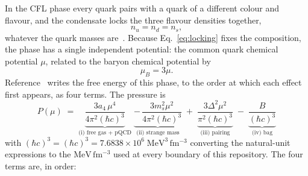 \documentclass[aps,prc,onecolumn,superscriptaddress,nofootinbib,10pt]{revtex4-2}
\newcommand{\muB}{\mu_B}
\newcommand{\hc}{(\hbar c)^3}
\newcommand{\ms}{m_s}
\begin{document}
In the CFL phase every quark pairs with a quark of a different colour and
flavour, and the condensate locks the three flavour densities together,
%
\begin{equation}
n_u = n_d = n_s ,
\label{eq:locking}
\end{equation}
%
whatever the quark masses are~\cite{AlfordRajagopalWilczek1999}. Because
Eq.~\eqref{eq:locking} fixes the composition, the phase has a single
independent potential: the common quark chemical potential $\mu$, related to
the baryon chemical potential by
%
\begin{equation}
\muB = 3\mu .
\label{eq:muB}
\end{equation}
%
Reference~\cite{AlfordBrabyParisReddy2005} writes the free energy of this
phase, to the order at which each effect first appears, as four terms. The
pressure is
%
\begin{equation}
\boxed{\;
P(\mu) \;=\; \underbrace{\frac{3 a_4\, \mu^4}{4\pi^2 \hc}}_{\text{(i) free gas
              + pQCD}}
        \;\underbrace{-\, \frac{3 \ms^2 \mu^2}{4\pi^2 \hc}}_{\text{(ii) strange
              mass}}
        \;+\; \underbrace{\frac{3 \Delta^2 \mu^2}{\pi^2 \hc}}_{\text{(iii)
              pairing}}
        \;-\; \underbrace{\frac{B}{\hc}}_{\text{(iv) bag}} \; }
\label{eq:P}
\end{equation}
%
with $\hc = (\hbar c)^3 = 7.6838\times 10^{6}\;\mathrm{MeV^3\,fm^{-3}}$
converting the natural-unit expressions to the $\mathrm{MeV\,fm^{-3}}$ used at
every boundary of this repository. The four terms are, in order:
\end{document}
